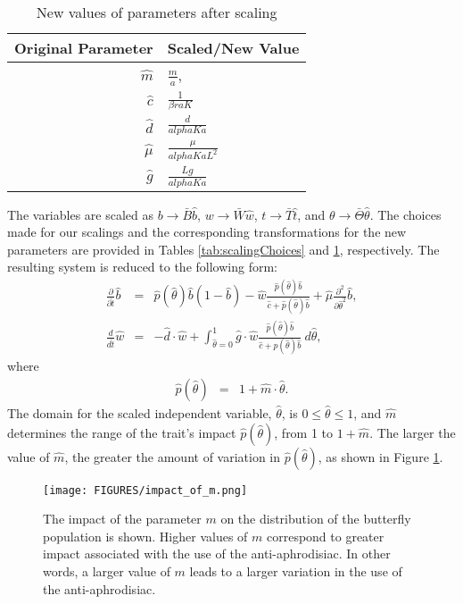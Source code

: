 \documentclass[review,authoryear]{elsarticle}
\def\alpha{alpha}%
\newcommand{\origB}{{b}}
\newcommand{\origW}{{w}}
\newcommand{\origAlpha}{{\alpha}}
\newcommand{\origK}{{K}}
\newcommand{\origA}{{a}}
\newcommand{\origD}{{d}}
\newcommand{\origG}{{g}}
\newcommand{\origL}{{L}}
\newcommand{\origTheta}{{\theta}}
\newcommand{\origT}{{t}}
\newcommand{\origMu}{{\mu}}
\newcommand{\origM}{m}
\newcommand{\scaledB}{\hat{b}}
\newcommand{\scaledW}{\hat{w}}
\newcommand{\scaledC}{\hat{c}}
\newcommand{\scaledD}{\hat{d}}
\newcommand{\scaledG}{\hat{g}}
\newcommand{\scaledP}[1]{\hat{p}(#1)}
\newcommand{\scaledTheta}{\hat{\theta}}
\newcommand{\scaledT}{\hat{t}}
\newcommand{\scaledMu}{\hat{\mu}}
\newcommand{\scaledM}{\hat{m}}
\begin{document}
\begin{table}[ht]
  \centering
  \begin{tabular}{r@{$\,=\,$}l}
  Original Parameter & Scaled/New Value \\ \hline
    $\hat{m}$   & $\frac{m}{a}$, \\  [10pt]
    $\hat{c}$   & $\frac{1}{\beta r \origA \origK}$ \\  [10pt]
    $\hat{d}$   & $\frac{\origD}{\origAlpha\origK a}$ \\  [10pt]
    $\hat{\mu}$ & $\frac{\origMu}{\origAlpha \origK\origA\origL^2}$  \\  [10pt]
    $\hat{g}$   & $\frac{\origL\origG}{\origAlpha\origK a}$
  \end{tabular}
  \caption{New values of parameters after scaling}
  \label{tab:newParameters}
\end{table}

The variables are scaled as $\origB\rightarrow \bar{B}\scaledB$,
$\origW\rightarrow \bar{W}\scaledW$, $\origT\rightarrow \bar{T}\scaledT$, and
$\origTheta\rightarrow \bar{\Theta}\scaledTheta$. The choices made for our
scalings and the
corresponding transformations for the new parameters are provided in Tables \ref{tab:scalingChoices} and \ref{tab:newParameters}, respectively. The resulting system is reduced to
the following form:
\begin{eqnarray}
  \label{eq:scaledodePDE1}
  \frac{\partial}{\partial \scaledT} \scaledB & = &
      \hat{p}(\scaledTheta) \scaledB (1 - \scaledB)
      -  \scaledW \frac{\scaledP{\scaledTheta} \scaledB}{\scaledC + \scaledP{\scaledTheta}\scaledB}
      + \scaledMu \frac{\partial^2}{\partial \scaledTheta^2} \scaledB , \\
  \label{eq:scaledodePDE2}
  \frac{d}{d\scaledT} \scaledW & = & -\scaledD \cdot \scaledW +
      \int^1_{\scaledTheta=0} \scaledG \cdot \scaledW \frac{\scaledP{\scaledTheta} \scaledB }{\scaledC + \scaledP{\scaledTheta} \scaledB} ~ d\scaledTheta,
\end{eqnarray}
where
\begin{eqnarray}
    \label{eq:definitionP}
  \scaledP{\scaledTheta} & = & 1 + \scaledM \cdot \scaledTheta.
\end{eqnarray}
The domain for the scaled independent variable, $\scaledTheta$, is
$0\leq\scaledTheta\leq 1$, and $\scaledM$ determines the range of the trait's impact $\scaledP{\scaledTheta}$, from 1 to $1+\scaledM$. 
The larger the value of $\scaledM$, the greater the amount of variation in $\scaledP{\scaledTheta}$, as shown in Figure \ref{fig:impact_of_m}.
\begin{figure}[htb]
  \centering
  \texttt{[image: FIGURES/impact\_of\_m.png]}
  \caption[Schematic representation of the impact of the parameter $\origM$.]{The impact of the parameter $\origM$ on the distribution of the butterfly population is shown. Higher values of $\origM$ correspond to greater impact associated with the use of the anti-aphrodisiac. In other words, a larger value of $\origM$ leads to a larger variation in the use of the anti-aphrodisiac.}
  \label{fig:impact_of_m}
\end{figure}
\end{document}
